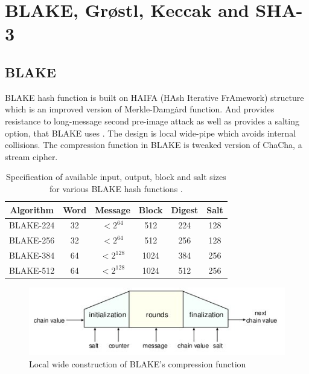 \chapter{BLAKE, Gr{\o}stl, Keccak and SHA-3}

\section{BLAKE} 

BLAKE \cite{00002} hash function is built on HAIFA (HAsh Iterative FrAmework) structure \cite{00020} which is an improved
version of Merkle-Damg\.{a}rd function. And provides resistance to long-message second pre-image attack as well as
provides a salting option, that BLAKE uses \cite{00021}.
The design is local wide-pipe which avoids internal collisions. The compression function in BLAKE is tweaked version of 
ChaCha, a stream cipher. 

\begin{table}[h]
  \begin{center}
    \begin{tabular}{ *{6}{c} } \hline
      Algorithm & Word & Message    & Block & Digest & Salt \\ \hline
      BLAKE-224 & 32   & $< 2^{64}$  & 512   & 224    & 128  \\
      BLAKE-256 & 32   & $< 2^{64}$  & 512   & 256    & 128  \\
      BLAKE-384 & 64   & $< 2^{128}$ & 1024  & 384    & 256  \\
      BLAKE-512 & 64   & $< 2^{128}$ & 1024  & 512    & 256  \\ \hline
    \end{tabular}
    \caption{Specification of available input, output, block and salt sizes for various BLAKE hash functions \cite{00002}.}
  \end{center}
\end{table}

\begin{figure}[h]
  \begin{center}
    \includegraphics[width=4.75in]{blakelocalwidepipeconstruction.jpg}
  \end{center}
  \caption{Local wide construction of BLAKE's compression function \cite{00002}}
  \label{fig:lab}
\end{figure}

